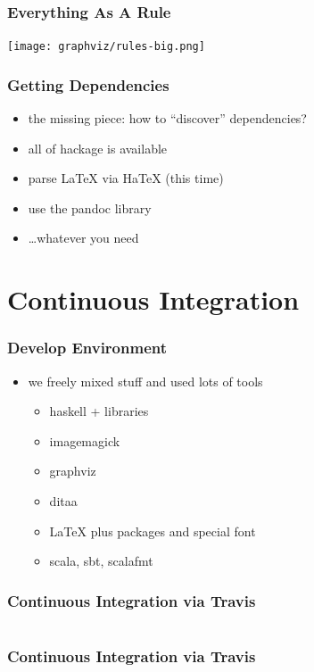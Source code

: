 \documentclass{beamer}
\begin{document}
\begin{frame}
  \frametitle{Everything As A Rule}
  \begin{center}
    \texttt{[image: graphviz/rules-big.png]}
  \end{center}
\end{frame}

\begin{frame}
  \frametitle{Getting Dependencies}
  \begin{itemize}
  \item the missing piece: how to ``discover'' dependencies?
  \item all of hackage is available
  \item parse LaTeX via HaTeX (this time)
  \item use the pandoc library
  \item \ldots whatever you need
  \end{itemize}
\end{frame}

\section{Continuous Integration}

\begin{frame}
  \frametitle{Develop Environment}
  \begin{itemize}
  \item we freely mixed stuff and used lots of tools
    \begin{itemize}
    \item haskell + libraries
    \item imagemagick
    \item graphviz
    \item ditaa
    \item LaTeX plus packages and special font
    \item scala, sbt, scalafmt
    \end{itemize}
  \end{itemize}
\end{frame}

\begin{frame}
  \frametitle{Continuous Integration via Travis}
  \inputminted[linenos=false, fontsize=\tiny, lastline=31]{yaml}{static-source/long-travis-ci.yml}
\end{frame}

\begin{frame}
  \frametitle{Continuous Integration via Travis}
  \inputminted[linenos=false, fontsize=\tiny, firstline=31, lastline=60]{yaml}{static-source/long-travis-ci.yml}
\end{frame}
\end{document}
